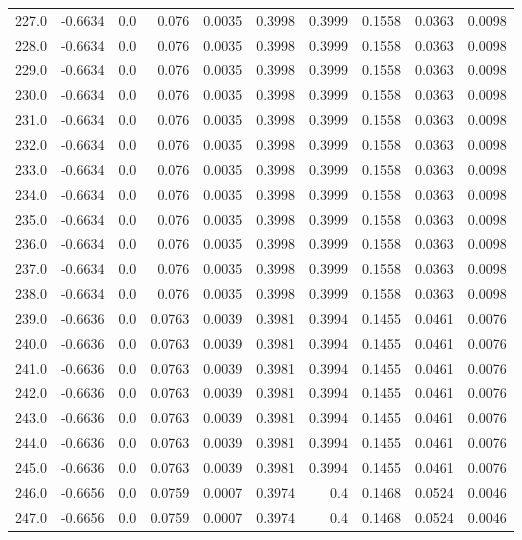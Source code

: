 \begin{longtable}{lrrrrrrrrr}
227.0 & -0.6634 & 0.0 & 0.076 & 0.0035 & 0.3998 & 0.3999 & 0.1558 & 0.0363 & 0.0098 \\
228.0 & -0.6634 & 0.0 & 0.076 & 0.0035 & 0.3998 & 0.3999 & 0.1558 & 0.0363 & 0.0098 \\
229.0 & -0.6634 & 0.0 & 0.076 & 0.0035 & 0.3998 & 0.3999 & 0.1558 & 0.0363 & 0.0098 \\
230.0 & -0.6634 & 0.0 & 0.076 & 0.0035 & 0.3998 & 0.3999 & 0.1558 & 0.0363 & 0.0098 \\
231.0 & -0.6634 & 0.0 & 0.076 & 0.0035 & 0.3998 & 0.3999 & 0.1558 & 0.0363 & 0.0098 \\
232.0 & -0.6634 & 0.0 & 0.076 & 0.0035 & 0.3998 & 0.3999 & 0.1558 & 0.0363 & 0.0098 \\
233.0 & -0.6634 & 0.0 & 0.076 & 0.0035 & 0.3998 & 0.3999 & 0.1558 & 0.0363 & 0.0098 \\
234.0 & -0.6634 & 0.0 & 0.076 & 0.0035 & 0.3998 & 0.3999 & 0.1558 & 0.0363 & 0.0098 \\
235.0 & -0.6634 & 0.0 & 0.076 & 0.0035 & 0.3998 & 0.3999 & 0.1558 & 0.0363 & 0.0098 \\
236.0 & -0.6634 & 0.0 & 0.076 & 0.0035 & 0.3998 & 0.3999 & 0.1558 & 0.0363 & 0.0098 \\
237.0 & -0.6634 & 0.0 & 0.076 & 0.0035 & 0.3998 & 0.3999 & 0.1558 & 0.0363 & 0.0098 \\
238.0 & -0.6634 & 0.0 & 0.076 & 0.0035 & 0.3998 & 0.3999 & 0.1558 & 0.0363 & 0.0098 \\
239.0 & -0.6636 & 0.0 & 0.0763 & 0.0039 & 0.3981 & 0.3994 & 0.1455 & 0.0461 & 0.0076 \\
240.0 & -0.6636 & 0.0 & 0.0763 & 0.0039 & 0.3981 & 0.3994 & 0.1455 & 0.0461 & 0.0076 \\
241.0 & -0.6636 & 0.0 & 0.0763 & 0.0039 & 0.3981 & 0.3994 & 0.1455 & 0.0461 & 0.0076 \\
242.0 & -0.6636 & 0.0 & 0.0763 & 0.0039 & 0.3981 & 0.3994 & 0.1455 & 0.0461 & 0.0076 \\
243.0 & -0.6636 & 0.0 & 0.0763 & 0.0039 & 0.3981 & 0.3994 & 0.1455 & 0.0461 & 0.0076 \\
244.0 & -0.6636 & 0.0 & 0.0763 & 0.0039 & 0.3981 & 0.3994 & 0.1455 & 0.0461 & 0.0076 \\
245.0 & -0.6636 & 0.0 & 0.0763 & 0.0039 & 0.3981 & 0.3994 & 0.1455 & 0.0461 & 0.0076 \\
246.0 & -0.6656 & 0.0 & 0.0759 & 0.0007 & 0.3974 & 0.4 & 0.1468 & 0.0524 & 0.0046 \\
247.0 & -0.6656 & 0.0 & 0.0759 & 0.0007 & 0.3974 & 0.4 & 0.1468 & 0.0524 & 0.0046 \\

\end{longtable}
